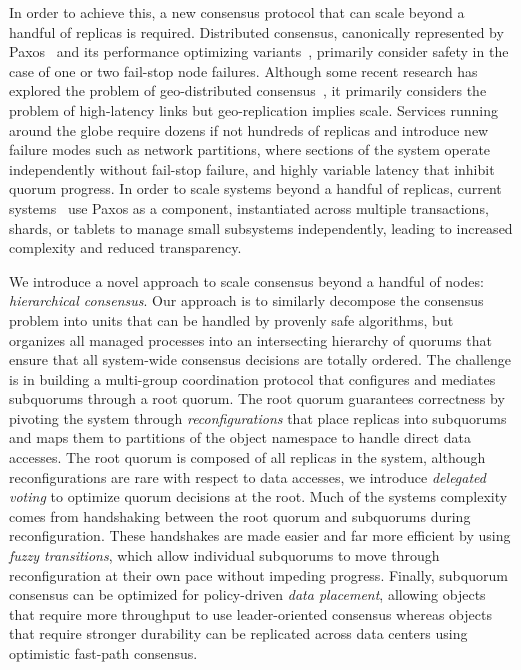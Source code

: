 \documentclass[11pt,conference]{IEEEtran}
\newcommand{\hc}{hierarchical consensus\xspace}
\newcommand{\subs}{subquorums\xspace}
\newcommand{\roo}{root quorum\xspace}
\begin{document}
In order to achieve this, a new consensus protocol that can scale beyond a handful of
replicas is required.
Distributed consensus, canonically represented by Paxos~\cite{paxos_simple} and its
performance optimizing
variants~\cite{fast_paxos,multicoordinated_paxos,spaxos,generalized_paxos}, primarily
consider safety in the case of one or two fail-stop node failures.
Although some recent research has explored the problem of geo-distributed
consensus~\cite{mencius,epaxos}, it primarily considers the problem of high-latency
links but geo-replication implies scale.
Services running around the globe require dozens if not hundreds of replicas and
introduce new failure modes such as network partitions, where sections of the system
operate independently without fail-stop failure, and highly variable latency that
inhibit quorum progress.
In order to scale systems beyond a handful of replicas, current
systems~\cite{spanner,scatter,mdcc,calvinfs} use Paxos as a component, instantiated
across multiple transactions, shards, or tablets to manage small subsystems
independently, leading to increased complexity and reduced transparency.

We introduce a novel approach to scale consensus beyond a handful of nodes:
\emph{\hc}.
Our approach is to similarly decompose the consensus problem into units that can be
handled by provenly safe algorithms, but organizes all managed processes into an
intersecting hierarchy of quorums that ensure that all system-wide consensus decisions
are totally ordered.
The challenge is in building a multi-group coordination protocol that configures and
mediates \subs through a \roo.
The \roo guarantees correctness by pivoting the system through \emph{reconfigurations}
that place replicas into \subs and maps them to partitions of the object namespace to
handle direct data accesses.
The \roo is composed of all replicas in the system, although reconfigurations are rare
with respect to data accesses, we introduce \emph{delegated voting} to optimize quorum
decisions at the root.
Much of the systems complexity comes from handshaking between the \roo and \subs during
reconfiguration.
These handshakes are made easier and far more efficient by using \emph{fuzzy transitions},
which allow individual \subs to move through reconfiguration at their own pace without
impeding progress.
Finally, subquorum consensus can be optimized for policy-driven \emph{data placement},
allowing objects that require more throughput to use leader-oriented consensus whereas
objects that require stronger durability can be replicated across data centers using
optimistic fast-path consensus.
\end{document}
